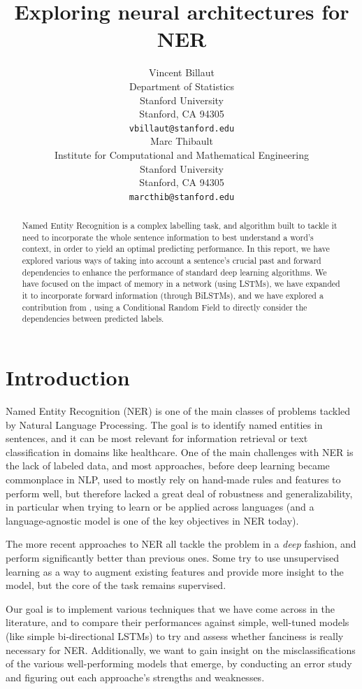 \documentclass{article} %
\title{Exploring neural architectures for NER}
\author{
Vincent Billaut\\
Department of Statistics\\
Stanford University\\
Stanford, CA 94305 \\
\texttt{vbillaut@stanford.edu} \\
\And
Marc Thibault \\
Institute for Computational and Mathematical Engineering \\
Stanford University\\
Stanford, CA 94305 \\
\texttt{marcthib@stanford.edu} \\
}
\begin{document}
\maketitle

\begin{abstract}

Named Entity Recognition is a complex labelling task, and algorithm built to tackle it need to incorporate the whole sentence information to best understand a word's context, in order to yield an optimal predicting performance. In this report, we have explored various ways of taking into account a sentence's crucial past and forward dependencies to enhance the performance of standard deep learning algorithms. We have focused on the impact of memory in a network (using LSTMs), we have expanded it to incorporate forward information (through BiLSTMs), and we have explored a contribution from \cite{lample2016neural}, using a Conditional Random Field to directly consider the dependencies between predicted labels.
\end{abstract}

\section{Introduction}



Named Entity Recognition (NER) is one of the main classes of problems tackled by Natural Language Processing. The goal is to identify named entities in sentences, and it can be most relevant for information retrieval or text classification in domains like healthcare.
One of the main challenges with NER is the lack of labeled data, and
most approaches, before deep learning became commonplace in NLP, used to mostly rely on hand-made rules and features to perform well, but therefore lacked a great deal of robustness and generalizability, in particular when trying to learn or be applied across languages (and a language-agnostic model is one of the key objectives in NER today).

The more recent approaches to NER all tackle the problem in a \textit{deep} fashion, and perform significantly better than previous ones. Some try to use unsupervised learning as a way to augment existing features and provide more insight to the model, but the core of the task remains supervised.

Our goal is to implement various techniques that we have come across in the literature, and to compare their performances against simple, well-tuned models (like simple bi-directional LSTMs) to try and assess whether fanciness is really necessary for NER. Additionally, we want to gain insight on the misclassifications of the various well-performing models that emerge, by conducting an error study and figuring out each approache's strengths and weaknesses.
\end{document}
